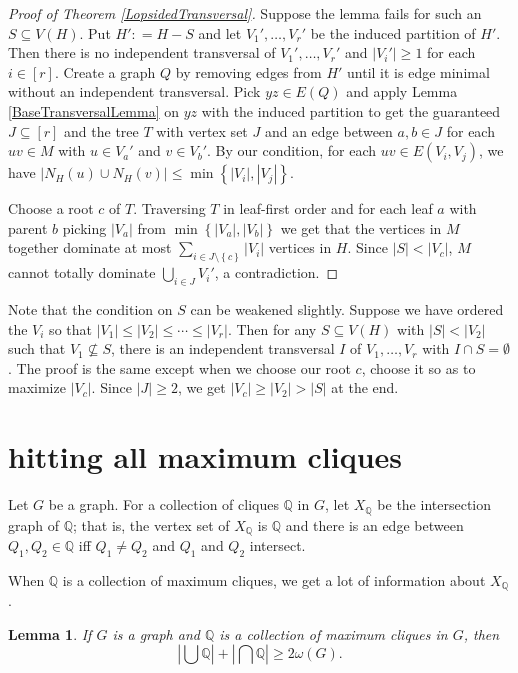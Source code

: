 \documentclass{amsbook}
\theoremstyle{plain}
\newtheorem{lemma}{Lemma}
\numberwithin{equation}{chapter}
\newcommand{\set}[1]{\left\{ #1 \right\}}
\newcommand{\card}[1]{\left|#1\right|}
\newcommand{\irange}[1]{\left[#1\right]}
\newcommand{\DefinedAs}{\mathrel{\mathop:}=}
\newcommand{\Q}{\mathbb{Q}}
\begin{document}
\begin{proof}[Proof of Theorem \ref{LopsidedTransversal}]
Suppose the lemma fails for such an $S \subseteq V(H)$.  Put $H' \DefinedAs H - S$ and let $V_1', \ldots, V_r'$ be the induced partition of $H'$. Then there is no independent transversal of $V_1', \ldots, V_r'$ and $\card{V_i'} \geq 1$ for each $i \in \irange{r}$. Create a graph $Q$ by removing edges from $H'$ until it is edge minimal without an independent transversal. Pick $yz \in E(Q)$ and apply Lemma 
\ref{BaseTransversalLemma} on $yz$ with the induced partition to get the guaranteed 
$J \subseteq \irange{r}$ and the tree $T$ with vertex set $J$ and an edge between $a, b \in
J$ for each $uv \in M$ with $u \in V_a'$ and $v \in V_b'$.  By our condition, for each $uv \in E(V_i, V_j)$, we have $\card{N_H(u) \cup N_H(v)} \leq \min\set{\card{V_i}, \card{V_j}}$.

Choose a root $c$ of $T$. Traversing $T$ in leaf-first order and for each leaf $a$ with parent $b$ picking $|V_a|$ from $\min\set{|V_a|, |V_b|}$ we get that the vertices in $M$ together dominate at most $\sum_{i \in J \setminus \set{c}} \card{V_i}$ vertices in $H$.  Since $\card{S} < \card{V_c}$, $M$ cannot totally dominate $\bigcup_{i \in J} V_i'$, a contradiction.
\end{proof}

Note that the condition on $S$ can be weakened slightly.  Suppose we have ordered the $V_i$ so that $\card{V_1} \leq \card{V_2} \leq \cdots \leq \card{V_r}$.  Then for any $S \subseteq V(H)$ with $\card{S} < \card{V_2}$ such that $V_1 \not \subseteq S$, there is an independent transversal $I$ of $V_1, \ldots, V_r$ with $I \cap S = \emptyset$.  The proof is the same except when we choose our root $c$, choose it so as to maximize $\card{V_c}$.  
Since $\card{J} \geq 2$, we get $\card{V_c} \geq \card{V_2} > \card{S}$ at the end.

\section*{hitting all maximum cliques}
\begin{defn}
Let $G$ be a graph. For a collection of cliques $\Q$ in $G$, let $X_\Q$ be the intersection graph of $\Q$; that is, the 
vertex set of $X_\Q$ is $\Q$ and there is an edge between $Q_1, Q_2 \in \Q$ iff $Q_1 \ne Q_2$ and $Q_1$ and $Q_2$ intersect.
\end{defn}

When $\Q$ is a collection of maximum cliques, we get a lot of information about $X_\Q$.  
\begin{lemma}\label{HajnalLemma}
If $G$ is a graph and $\Q$ is a collection of maximum cliques in $G$, then 
\[\card{\bigcup \Q} + \card{\bigcap \Q} \geq 2\omega(G).\]
\end{lemma}
\end{document}

